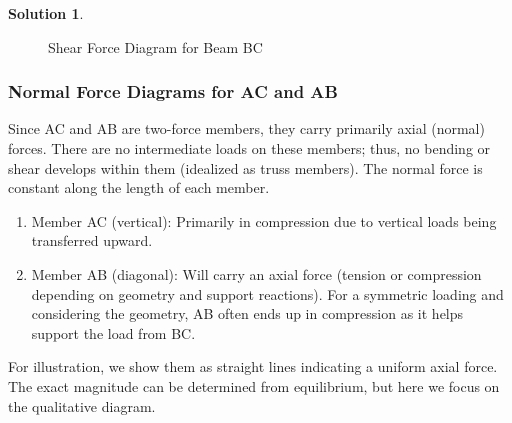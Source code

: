 \documentclass[12pt]{article}
\theoremstyle{definition} %
\newtheorem{solution}{Solution}
\theoremstyle{plain} %
\begin{document}
\begin{solution}
\begin{enumerate}
\begin{figure}[h!]
            \label{f3}
            \caption{Shear Force Diagram for Beam BC}
            \end{figure}
            
        
        
        \subsubsection*{Normal Force Diagrams for AC and AB}
        
        Since AC and AB are two-force members, they carry primarily axial (normal) forces. There are no intermediate loads on these members; thus, no bending or shear develops within them (idealized as truss members). The normal force is constant along the length of each member.
       \begin{enumerate}
        \item Member AC (vertical): Primarily in compression due to vertical loads being transferred upward.
        \item Member AB (diagonal): Will carry an axial force (tension or compression depending on geometry and support reactions). For a symmetric loading and considering the geometry, AB often ends up in compression as it helps support the load from BC.
        

       \end{enumerate} 
                 For illustration, we show them as straight lines indicating a uniform axial force. The exact magnitude can be determined from equilibrium, but here we focus on the qualitative diagram.
        
        \begin{figure}[h!]
        \centering
\end{figure}
\end{enumerate}
\end{solution}
\end{document}
